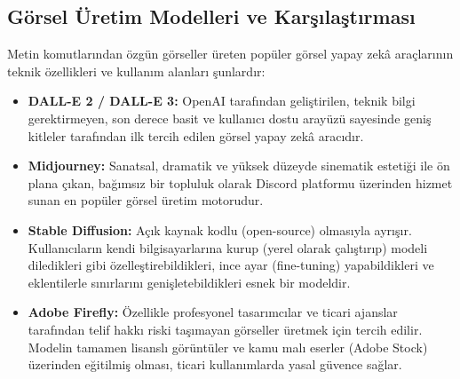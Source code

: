 \documentclass[11pt,a4paper,openany]{book}
\begin{document}
\subsection{Görsel Üretim Modelleri ve Karşılaştırması}
Metin komutlarından özgün görseller üreten popüler görsel yapay zekâ araçlarının teknik özellikleri ve kullanım alanları şunlardır:
\begin{itemize}
    \item \textbf{DALL-E 2 / DALL-E 3:} OpenAI tarafından geliştirilen, teknik bilgi gerektirmeyen, son derece basit ve kullanıcı dostu arayüzü sayesinde geniş kitleler tarafından ilk tercih edilen görsel yapay zekâ aracıdır.
    \item \textbf{Midjourney:} Sanatsal, dramatik ve yüksek düzeyde sinematik estetiği ile ön plana çıkan, bağımsız bir topluluk olarak Discord platformu üzerinden hizmet sunan en popüler görsel üretim motorudur.
    \item \textbf{Stable Diffusion:} Açık kaynak kodlu (open-source) olmasıyla ayrışır. Kullanıcıların kendi bilgisayarlarına kurup (yerel olarak çalıştırıp) modeli diledikleri gibi özelleştirebildikleri, ince ayar (fine-tuning) yapabildikleri ve eklentilerle sınırlarını genişletebildikleri esnek bir modeldir.
    \item \textbf{Adobe Firefly:} Özellikle profesyonel tasarımcılar ve ticari ajanslar tarafından telif hakkı riski taşımayan görseller üretmek için tercih edilir. Modelin tamamen lisanslı görüntüler ve kamu malı eserler (Adobe Stock) üzerinden eğitilmiş olması, ticari kullanımlarda yasal güvence sağlar.
\end{itemize}

\needspace{9cm}
\end{document}
